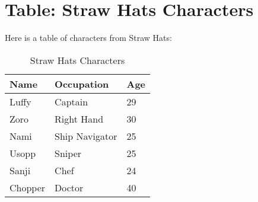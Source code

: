 \documentclass{article}
\begin{document}
\section{Table: Straw Hats Characters}
Here is a table of characters from Straw Hats:
\begin{table}[h]
    \centering
    \caption{Straw Hats Characters}
    \begin{tabular}{@{}lll@{}}
        \toprule
        \textbf{Name} & \textbf{Occupation}      & \textbf{Age} \\ \midrule
        Luffy         & Captain                     & 29           \\
        Zoro          & Right Hand                  & 30           \\
        Nami          & Ship Navigator              & 25           \\
        Usopp         & Sniper                      & 25           \\
        Sanji         & Chef                        & 24           \\ 
        Chopper       & Doctor                      & 40           \\ \bottomrule
    \end{tabular}
\end{table}
\end{document}
